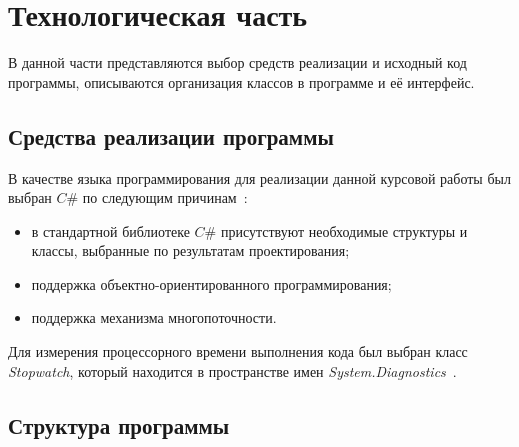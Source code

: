 \chapter{Технологическая часть}

В данной части представляются выбор средств реализации и исходный код программы, описываются организация классов в программе и её интерфейс.

\section{Средства реализации программы}

В качестве языка программирования для реализации данной курсовой работы был выбран $C\#$ по следующим причинам~\cite{lit9}:
\begin{itemize}[label=--]
	\item в стандартной библиотеке $C\#$ присутствуют необходимые структуры и классы, выбранные по результатам проектирования;
	\item поддержка объектно-ориентированного программирования;
	\item поддержка механизма многопоточности.
\end{itemize}

Для измерения процессорного времени выполнения кода был выбран класс \textit{Stopwatch}, который находится в пространстве имен \textit{System.Diagnostics}~\cite{lit10}.

\section{Структура программы}

